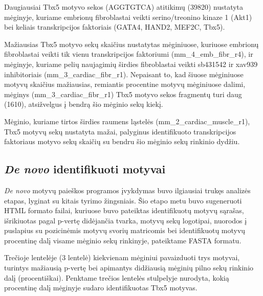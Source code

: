 \documentclass[12pt]{article}
\begin{document}
Daugiausiai Tbx5 motyvo sekos (AGGTGTCA) atitikimų (39820) nustatyta mėginyje,
kuriame embrionų fibroblastai veikti serino/treonino kinaze 1 (Akt1) bei
keliais transkripcijos faktoriais (GATA4, HAND2, MEF2C, Tbx5).

Mažiausias Tbx5 motyvo sekų skaičius nustatytas mėginiuose, kuriuose embrionų
fibroblastai veikti tik vienu transkripcijos faktoriumi (mm\_4\_emb\_fibr\_r4),
ir mėginyje, kuriame pelių naujagimių širdies fibroblastai veikti sb431542 ir
xav939 inhibitoriais (mm\_3\_cardiac\_fibr\_r1). Nepaisant to, kad šiuose
mėginiuose motyvų skaičius mažiausias, remiantis procentine motyvų mėginiuose
dalimi, mėginys (mm\_3\_cardiac\_fibr\_r1) Tbx5 motyvo sekos fragmentų turi
daug (1610), atsižvelgus į bendrą šio mėginio sekų kiekį.

Mėginio, kuriame tirtos širdies raumens ląstelės (mm\_2\_cardiac\_muscle\_r1),
Tbx5 motyvų sekų nustatyta mažai, palyginus identifikuoto transkripcijos
faktoriaus motyvo sekų skaičių su bendru šio mėginio sekų rinkinio dydžiu.

\newpage

\subsection{\emph{De novo} identifikuoti motyvai}
\emph{De novo} motyvų paieškos programos įvykdymas buvo ilgiausiai trukęs
analizės etapas, lyginat su kitais  tyrimo žingsniais. Šio etapo metu buvo
sugeneruoti HTML formato failai, kuriuose buvo pateiktas identifikuotų motyvų
sąrašas, išrikiuotas pagal p-vertę didėjančia tvarka, motyvų sekų logotipai,
nuorodos į puslapius su pozicinėmis motyvų svorių matricomis bei identifikuotų
motyvų procentinę dalį visame mėginio sekų rinkinyje, pateiktame FASTA formatu.

Trečioje lentelėje (3 lentelė) kiekvienam mėginiui pavaizduoti trys motyvai,
turintys mažiausią p-vertę bei apimantys didžiausią mėginių pilno sekų rinkinio
dalį (procentiškai). Penktame trečios lentelės stulpelyje nurodyta, kokią
procentinę dalį mėginyje sudaro identifikuotas Tbx5 motyvas.
\end{document}
